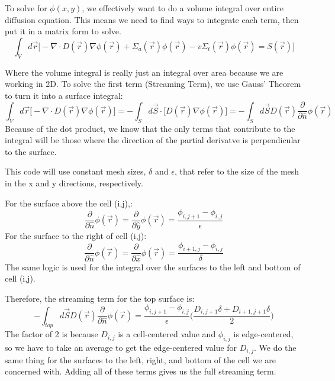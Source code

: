 \documentclass[a4paper,12pt]{article}
\begin{document}
To solve for $\phi(x,y)$, we effectively want to do a volume integral over entire diffusion equation. This means we need to find ways to integrate each term, then put it in a matrix form to solve.
\begin{equation}
    \int_{V}d\vec{r}\big[ -\nabla \cdot D(\vec{r})\nabla\phi(\vec{r}) + \Sigma_{a}(\vec{r})\phi(\vec{r}) - v\Sigma_{t}(\vec{r})\phi(\vec{r})= S(\vec{r})
\big]
\end{equation}

Where the volume integral is really just an integral over area because we are working in 2D. To solve the first term (Streaming Term), we use Gauss' Theorem to turn it into a surface integral:
\begin{equation}
    \int_{V}d\vec{r}\big[ -\nabla \cdot D(\vec{r})\nabla\phi(\vec{r})\big] = -\int_{S}d\vec{S}\cdot\big[ D(\vec{r})\nabla\phi(\vec{r})\big] = -\int_{S}d\vec{S}D(\vec{r})\frac{\partial}{\partial\hat n}\phi(\vec{r})
\end{equation}
Because of the dot product, we know that the only terms that contribute to the integral will be those where the direction of the partial derivatve is perpendicular to the surface.

This code will use constant mesh sizes, $\delta$ and $\epsilon$, that refer to the size of the mesh in the x and y directions, respectively.

For the surface above the cell (i,j),:
\begin{equation}
    \frac{\partial}{\partial \hat n}\phi(\vec{r}) = \frac{\partial}{\partial \hat y}\phi(\vec{r}) = \frac{\phi_{i,j+1} - \phi_{i,j}}{\epsilon}
\end{equation}
For the surface to the right of cell (i,j):
\begin{equation}
     \frac{\partial}{\partial \hat n}\phi(\vec{r}) = \frac{\partial}{\partial \hat x}\phi(\vec{r}) = \frac{\phi_{i+1,j} - \phi_{i,j}}{\delta}
\end{equation}
The same logic is used for the integral over the surfaces to the left and bottom of cell (i,j).

Therefore, the streaming term for the top surface is:
\begin{equation}
    -\int_{top}d\vec{S}D(\vec{r})\frac{\partial}{\partial \hat n}\phi(\vec{r}) = \frac{\phi_{i,j+1} - \phi_{i,j}}{\epsilon} \bigg(\frac{D_{i,j+1}\delta + D_{i+1,j+1}\delta}{2}\bigg)
\end{equation}
The factor of 2 is because $D_{i,j}$ is a cell-centered value and $\phi_{i,j}$ is edge-centered, so we have to take an average to get the edge-centered value for $D_{i,j}$. We do the same thing for the surfaces to the left, right, and bottom of the cell we are concerned with. Adding all of these terms gives us the full streaming term.
\end{document}

